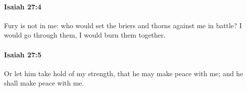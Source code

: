 		\paragraph{Isaiah 27:4} %
			\label{ISAIAH-27-4}

			Fury is not in me: who would set the briers and thorns against me in battle? I would go through them, I would burn them together.


		\paragraph{Isaiah 27:5} %
			\label{ISAIAH-27-5}

			Or let him take hold of my strength, that he may make peace with me; and he shall make peace with me.


